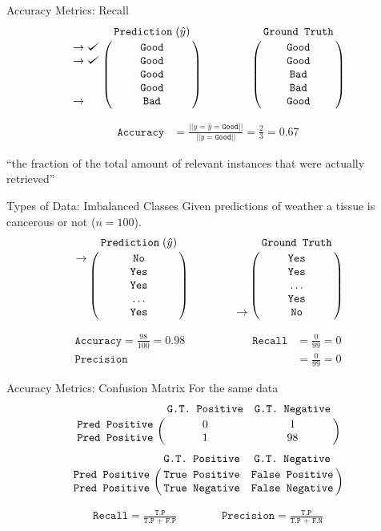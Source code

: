 \documentclass{beamer}
\def\checkmark{\tikz\fill[scale=0.4](0,.35) -- (.25,0) -- (1,.7) -- (.25,.15) -- cycle;}
\begin{document}
\begin{frame}{Accuracy Metrics: Recall}
$$
\bordermatrix{&\texttt{Prediction}\;(\hat{y})\cr
               \rightarrow\checkmark&\texttt{Good}\cr
               \rightarrow\checkmark&\texttt{Good}\cr
                &\texttt{Good}\cr
                &\texttt{Good}\cr
               \rightarrow&\texttt{Bad}}
\qquad \qquad
\bordermatrix{&\texttt{Ground Truth}\cr
                &\texttt{Good}\cr
                &\texttt{Good}\cr
                &\texttt{Bad}\cr
                &\texttt{Bad}\cr
                &\texttt{Good}}
$$

\begin{align*}
\texttt{Accuracy} &= \frac{||y = \hat{y} = \texttt{Good}||}{||y = \texttt{Good}||} = \frac{2}{3} = 0.67
\end{align*}

``the fraction of the total amount of relevant instances that were actually retrieved''

\end{frame}

\begin{frame}{Types of Data: Imbalanced Classes}
Given predictions of weather a tissue is cancerous or not ($n = 100$).
$$
\bordermatrix{&\texttt{Prediction}\;(\hat{y})\cr
               \rightarrow&\texttt{No}\cr
               &\texttt{Yes}\cr
                &\texttt{Yes}\cr
                &\ldots\cr
               &\texttt{Yes}}
\qquad \qquad
\bordermatrix{&\texttt{Ground Truth}\cr
                &\texttt{Yes}\cr
                &\texttt{Yes}\cr
                &\ldots\cr
                &\texttt{Yes}\cr
                \rightarrow&\texttt{No}}
$$

\begin{align*}
\texttt{Accuracy} = \frac{98}{100} = 0.98 \qquad \qquad \qquad
\texttt{Recall} &= \frac{0}{99} = 0 \\
\texttt{Precision} &= \frac{0}{99} = 0
\end{align*}


\end{frame}

\begin{frame}{Accuracy Metrics: Confusion Matrix}
For the same data
$$
\bordermatrix{&\texttt{G.T. Positive}&\texttt{G.T. Negative}\cr
               \texttt{Pred Positive}&0&1\cr
               \texttt{Pred Positive}&1&98}
$$
$$
\bordermatrix{&\texttt{G.T. Positive}&\texttt{G.T. Negative}\cr
               \texttt{Pred Positive}&\texttt{True Positive}&\texttt{False Positive}\cr
               \texttt{Pred Positive}&\texttt{True Negative}&\texttt{False Negative}}
$$


\begin{align*}
\texttt{Recall} = \frac{\texttt{T.P}}{\texttt{T.P + F.P}} \qquad \qquad 
\texttt{Precision} = \frac{\texttt{T.P}}{\texttt{T.P + F.N}}
\end{align*}
\end{frame}
\end{document}
